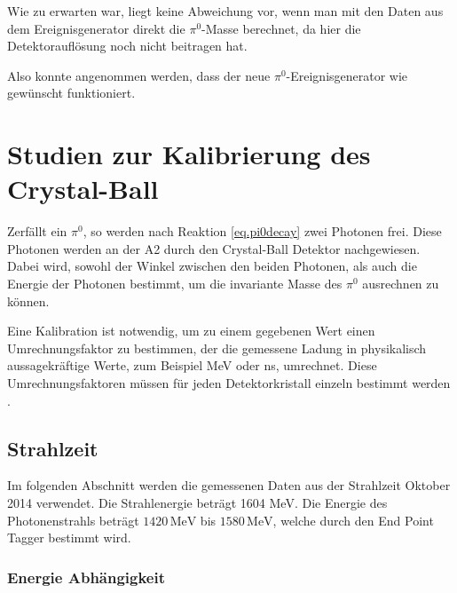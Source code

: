 \documentclass[a4paper,11pt,oneside,final,german,openbib,pdftex]{scrbook}
\begin{document}
{\begin{figure}[h!]
\end{figure}

Wie zu erwarten war, liegt keine Abweichung vor, wenn man mit den Daten aus dem Ereignisgenerator direkt die $\pi^0$-Masse berechnet, da hier die Detektoraufl\"osung noch nicht beitragen hat.

Also konnte angenommen werden, dass der neue $\pi^0$-Ereignisgenerator wie gewünscht funktioniert.











\chapter{Studien zur Kalibrierung des Crystal-Ball}
\label{chap:Studien}

Zerf\"allt ein $\pi^0$, so werden nach Reaktion \ref{eq.pi0decay} zwei Photonen frei. Diese Photonen werden an der A2 durch den Crystal-Ball Detektor nachgewiesen. Dabei wird, sowohl der Winkel zwischen den beiden Photonen, als auch die Energie der Photonen bestimmt, um die invariante Masse des $\pi^0$ ausrechnen zu k\"onnen.
\newline

Eine Kalibration ist notwendig, um zu einem gegebenen Wert einen Umrechnungsfaktor zu bestimmen, der die gemessene Ladung in physikalisch aussagekr\"aftige Werte, zum Beispiel MeV oder ns, umrechnet. Diese Umrechnungsfaktoren m\"ussen f\"ur jeden Detektorkristall einzeln bestimmt werden \cite{Un08}.



\section{Strahlzeit}
\label{sec:Reelle-Daten}

Im folgenden Abschnitt werden die gemessenen Daten aus der Strahlzeit Oktober 2014 verwendet. Die Strahlenergie betr\"agt 1604 MeV. Die Energie des Photonenstrahls betr\"agt $1420\,\text{MeV}$ bis $1580\,\text{MeV}$, welche durch den End Point Tagger bestimmt wird. 

\subsection{Energie Abhängigkeit}
\label{sec:Energie-Interval-Abhaengigkeit}

}
\end{document}
